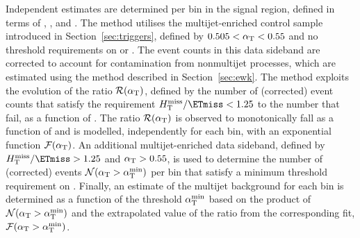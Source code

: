 Independent estimates are determined per bin in the signal region,
defined in terms of \njet, \nb, and \scalht. The method utilises the
multijet-enriched control sample introduced in
Section~\ref{sec:triggers}, defined by $0.505 < \alpha_\mathrm{T} < 0.55$ and no
threshold requirements on \dphi or \mhtmet. The event counts in this
data sideband are corrected to account for contamination from
nonmultijet processes, which are estimated using the method described
in Section~\ref{sec:ewk}. The method exploits the evolution of the
ratio $\mathcal{R}(\alpha_\mathrm{T})$, defined by the number of (corrected)
event counts that satisfy the requirement $\mhtmet < 1.25$ to the
number that fail, as a function of \alphat. The ratio
$\mathcal{R}(\alpha_\mathrm{T})$ is observed to monotonically fall as a function
of \alphat and is modelled, independently for each bin, with an
exponential function $\mathcal{F}(\alpha_\mathrm{T})$. An additional
multijet-enriched data sideband, defined by $\mhtmet > 1.25$ and
$\alpha_\mathrm{T} > 0.55$, is used to determine the number of (corrected)
events $\mathcal{N}(\alpha_\mathrm{T} > \alpha_\mathrm{T}^\text{min})$ per bin that satisfy a
minimum threshold requirement on \alphat. Finally, an estimate of the
multijet background for each bin is determined as a function of the
threshold $\alpha_\mathrm{T}^\text{min}$ based on the product of $\mathcal{N}(\alpha_\mathrm{T} >
\alpha_\mathrm{T}^\text{min})$ and the extrapolated value of the ratio from the
corresponding fit, $\mathcal{F}(\alpha_\mathrm{T} > \alpha_\mathrm{T}^\text{min})$.


